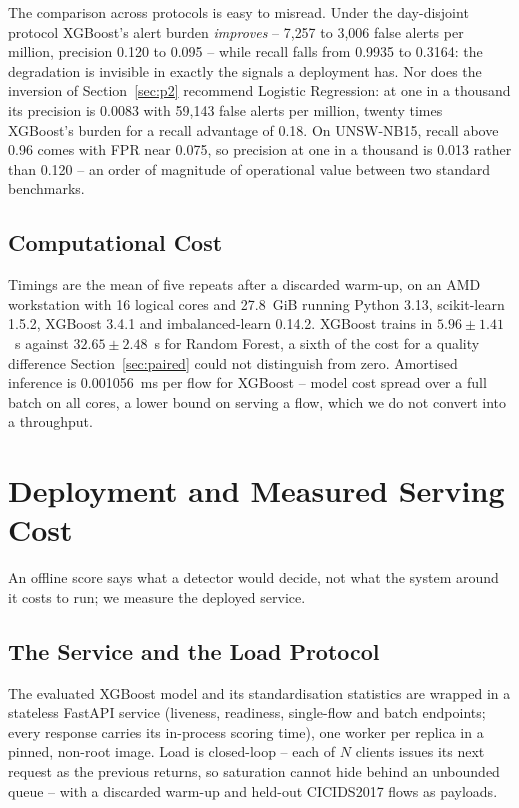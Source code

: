 \documentclass{llncs}
\newcommand{\inputtable}[1]{%
  \IfFileExists{tables/#1.tex}{}{}}
\begin{document}
\inputtable{operational}

The comparison across protocols is easy to misread. Under the day-disjoint
protocol XGBoost's alert burden \emph{improves} -- 7{,}257 to 3{,}006 false
alerts per million, precision 0.120 to 0.095 -- while recall falls from
0.9935 to 0.3164: the degradation is invisible in exactly the signals a
deployment has. Nor does the inversion of Section~\ref{sec:p2} recommend
Logistic Regression: at one in a thousand its precision is 0.0083 with
59{,}143 false alerts per million, twenty times XGBoost's burden for a recall
advantage of 0.18. On UNSW-NB15, recall above 0.96 comes with FPR near
0.075, so precision at one in a thousand is 0.013 rather than 0.120 -- an
order of magnitude of operational value between two standard benchmarks.

\subsection{Computational Cost}
\label{sec:cost}
Timings are the mean of five repeats after a discarded warm-up, on an AMD
workstation with 16 logical cores and 27.8~GiB running Python 3.13, scikit-learn 1.5.2,
XGBoost 3.4.1 and imbalanced-learn 0.14.2. XGBoost trains in
$5.96 \pm 1.41$~s against $32.65 \pm 2.48$~s for Random Forest, a sixth of
the cost for a quality difference Section~\ref{sec:paired} could not
distinguish from zero. Amortised inference is 0.001056~ms per flow for XGBoost -- model cost
spread over a full batch on all cores, a lower bound on serving a flow, which
we do not convert into a throughput.

\section{Deployment and Measured Serving Cost}
\label{sec:serving}
An offline score says what a detector would decide, not what the system
around it costs to run; we measure the deployed service.

\subsection{The Service and the Load Protocol}
The evaluated XGBoost model and its standardisation statistics are wrapped
in a stateless FastAPI service (liveness, readiness, single-flow and batch
endpoints; every response carries its in-process scoring time), one worker
per replica in a pinned, non-root image. Load is closed-loop -- each of $N$
clients issues its next request as the previous returns, so saturation
cannot hide behind an unbounded queue -- with a discarded warm-up and
held-out CICIDS2017 flows as payloads.
\end{document}
